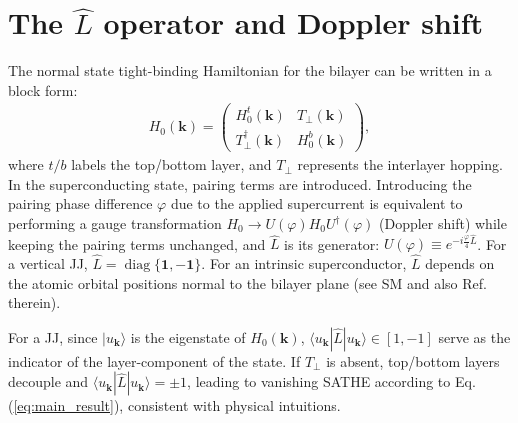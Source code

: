 \section{The $\hat L$ operator and Doppler shift}
The normal state tight-binding Hamiltonian for the bilayer can be written in a block form:
\begin{align}
	H_0(\bm{k})=\begin{pmatrix} H_0^t(\bm{k}) & T_\perp(\bm{k}) \\ T^\dagger_{\perp}(\bm{k}) & H_0^b(\bm{k})\end{pmatrix},\label{eq:H_0}
\end{align}
where $t/b$ labels the top/bottom layer, and $T_\perp$ represents the interlayer hopping. In the superconducting state, pairing terms are introduced. Introducing the pairing phase difference $\varphi$ due to the applied supercurrent is equivalent to performing a gauge transformation $H_0\rightarrow U (\varphi) H_0U^\dagger (\varphi)$ (Doppler shift) while keeping the pairing terms unchanged, and $\hat L$ is its generator: $U(\varphi)\equiv e^{-i\frac{\varphi}{4} \hat L}$. For a vertical JJ, $\hat L=\mathop{\mathrm{diag}}\{\mathbf{1},\mathbf{-1}\}$. For an intrinsic superconductor, $\hat L$ depends on the atomic orbital positions normal to the bilayer plane (see SM \cite{SM} and also Ref. \cite{crowley2022supercurrent} therein).

For a JJ, since $|u_{\bm{k}}\rangle$ is the eigenstate of $H_0(\bm{k})$, $\langle u_{\bm{k}}|\hat L|u_{\bm{k}}\rangle \in [1,-1]$ serve as the indicator of the layer-component of the state. If $T_\perp$ is absent, top/bottom layers decouple and $\langle u_{\bm{k}}|\hat L|u_{\bm{k}}\rangle =\pm 1$, leading to vanishing SATHE according to Eq.(\ref{eq:main_result}), consistent with physical intuitions. 

